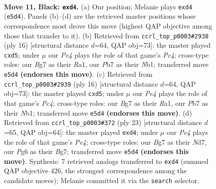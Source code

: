 \documentclass[11pt]{article}
\begin{document}
\clearpage

\begin{figure}[p]\centering
\begin{subfigure}{0.46\textwidth}\centering
\resizebox{\linewidth}{!}{%
\newchessgame
\chessboard[
  setfen={rnbq1rk1/pp3pbp/1n1p2p1/4p3/3P4/1BP1B3/PP3PPP/RN1QNRK1 b - - 0 11},
  showmover=false,
  pgfstyle=straightmove, color=movearrow, markmove={e5-d4}
]}
\caption{}
\end{subfigure}\hfill
\begin{subfigure}{0.46\textwidth}\centering
\resizebox{\linewidth}{!}{%
\newchessgame
\chessboard[
  setfen={r1bq1rk1/pp3ppp/2n1pn2/2bp4/2P5/1P3NP1/P3PPBP/RNBQ1RK1 w - - 1 9},
  showmover=false,
  pgfstyle=straightmove, color=movearrow, markmove={c4-d5}
]}
\caption{}
\end{subfigure}
\\[4pt]
\begin{subfigure}{0.46\textwidth}\centering
\resizebox{\linewidth}{!}{%
\newchessgame
\chessboard[
  setfen={r1bq1rk1/pp3ppp/2n1pn2/2bp4/2P5/1P3NP1/P3PPBP/RNBQ1RK1 w - - 1 9},
  showmover=false,
  pgfstyle=straightmove, color=movearrow, markmove={c4-d5}
]}
\caption{}
\end{subfigure}\hfill
\begin{subfigure}{0.46\textwidth}\centering
\resizebox{\linewidth}{!}{%
\newchessgame
\chessboard[
  setfen={r1bq1rk1/pp1n1pbp/2p3p1/4p3/3P4/2P1BN2/PPB2PPP/R2Q1RK1 b - - 1 12},
  showmover=false,
  pgfstyle=straightmove, color=movearrow, markmove={e5-d4}
]}
\caption{}
\end{subfigure}
\caption{\textbf{Move 11, Black: \texttt{exd4}.} (a) Our position; Melanie plays \texttt{exd4} (\texttt{e5d4}). Panels (b)--(d) are the retrieved master positions whose correspondence most drove this move (highest QAP objective among those that transfer to it). (b) Retrieved from \texttt{ccrl\_top\_p0003\#2938} (ply 16) [structural distance $d$=64, QAP obj=73]: the master played \texttt{cxd5}; under $\mu$ our \emph{Pe4} plays the role of that game's \emph{Pc4}; cross-type roles: our \emph{B}g7 as their \emph{R}a1, our \emph{P}b7 as their \emph{N}b1; transferred move \texttt{e5d4} \textbf{(endorses this move)}. (c) Retrieved from \texttt{ccrl\_top\_p0003\#2939} (ply 16) [structural distance $d$=64, QAP obj=73]: the master played \texttt{cxd5}; under $\mu$ our \emph{Pe4} plays the role of that game's \emph{Pc4}; cross-type roles: our \emph{B}g7 as their \emph{R}a1, our \emph{P}b7 as their \emph{N}b1; transferred move \texttt{e5d4} \textbf{(endorses this move)}. (d) Retrieved from \texttt{ccrl\_top\_p0003\#372} (ply 23) [structural distance $d$=65, QAP obj=64]: the master played \texttt{exd4}; under $\mu$ our \emph{Pe4} plays the role of that game's \emph{Pe4}; cross-type roles: our \emph{B}g7 as their \emph{N}d7, our \emph{P}g6 as their \emph{B}g7; transferred move \texttt{e5d4} \textbf{(endorses this move)}. Synthesis: 7 retrieved analogs transferred to \texttt{exd4} (summed QAP objective 426, the strongest correspondence among the candidate moves); Melanie committed it via the \texttt{search} selector.}
\label{fig:thought-m21}
\end{figure}
\end{document}
